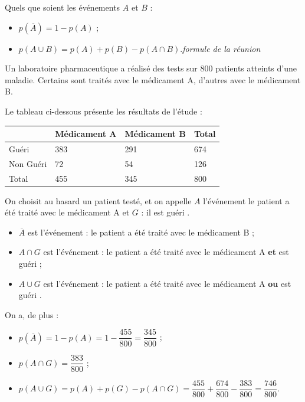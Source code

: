 \documentclass[a4paper,11pt]{article}
\begin{document}
\begin{cprop}[s]
Quels que soient les événements $A$ et $B$ :
\begin{itemize}
	\item $p(\overline{A})=1-p(A)$ ;
	\item $p(A \cup B)=p(A)+p(B)-p(A \cap B)$.\hfill{\red\itshape formule de la réunion}
\end{itemize}
\end{cprop}

\begin{cexemple}
Un laboratoire pharmaceutique a réalisé des tests sur 800 patients atteints d’une maladie. Certains sont traités avec le médicament A, d’autres avec le médicament B.

Le tableau ci-dessous présente les résultats de l’étude :
\begin{center}
	\begin{tabularx}{14cm}{|Y|Y|Y|Y|}
	& Médicament A & Médicament B & Total \\
	\hline
	Guéri & 383 & 291 & 674 \\
	\hline
	Non Guéri & 72 & 54 & 126 \\
	\hline
	Total & 455 & 345 & 800 \\
	\hline
\end{tabularx}
\end{center} 
On choisit au hasard un patient testé, et on appelle $A$ l'événement \og le patient a été traité avec le médicament A \fg{} et $G$ : \og il est guéri \fg.
\begin{itemize}[leftmargin=*]
	\item $\overline{A}$ est l'événement : \og le patient a été traité avec le médicament B \fg{} ;
	\item $A \cap G$ est l'événement : \og le patient a été traité avec le médicament A \textbf{et} est guéri \fg{} ;
	\item $A \cup G$ est l'événement : \og le patient a été traité avec le médicament A \textbf{ou} est guéri \fg.
\end{itemize}
On a, de plus :
\begin{itemize}[leftmargin=*]
	\item $p(\overline{A})=1-p(A)=1-\dfrac{455}{800}=\dfrac{345}{800}$ ;
	\item $p(A \cap G)=\dfrac{383}{800}$ ;
	\item $p(A \cup G)=p(A)+p(G)-p(A \cap G)=\dfrac{455}{800}+\dfrac{674}{800}-\dfrac{383}{800}=\dfrac{746}{800}$.
\end{itemize}
\end{cexemple}
\end{document}
